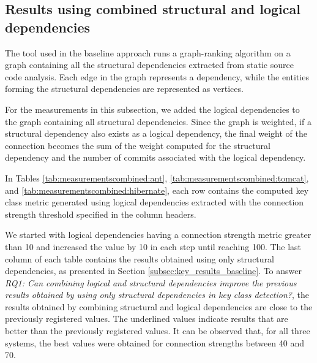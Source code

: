 \subsection{Results using combined structural and logical dependencies}
\label{subsec:key_results_combined}

\hspace{4em}The tool used in the baseline approach runs a graph-ranking algorithm on a graph containing all the structural dependencies extracted from static source code analysis. Each edge in the graph represents a dependency, while the entities forming the structural dependencies are represented as vertices.

For the measurements in this subsection, we added the logical dependencies to the graph containing all structural dependencies. Since the graph is weighted, if a structural dependency also exists as a logical dependency, the final weight of the connection becomes the sum of the weight computed for the structural dependency and the number of commits associated with the logical dependency.

In Tables \ref{tab:measurementscombined:ant}, \ref{tab:measurementscombined:tomcat}, and \ref{tab:measurementscombined:hibernate}, each row contains the computed key class metric generated using logical dependencies extracted with the connection strength threshold specified in the column headers.

We started with logical dependencies having a connection strength metric greater than 10 and increased the value by 10 in each step until reaching 100. The last column of each table contains the results obtained using only structural dependencies, as presented in Section \ref{subsec:key_results_baseline}. To answer \textit{RQ1: Can combining logical and structural dependencies improve the previous results obtained by using only structural dependencies in key class detection?}, the results obtained by combining structural and logical dependencies are close to the previously registered values. The underlined values indicate results that are better than the previously registered values. It can be observed that, for all three systems, the best values were obtained for connection strengths between 40 and 70.

